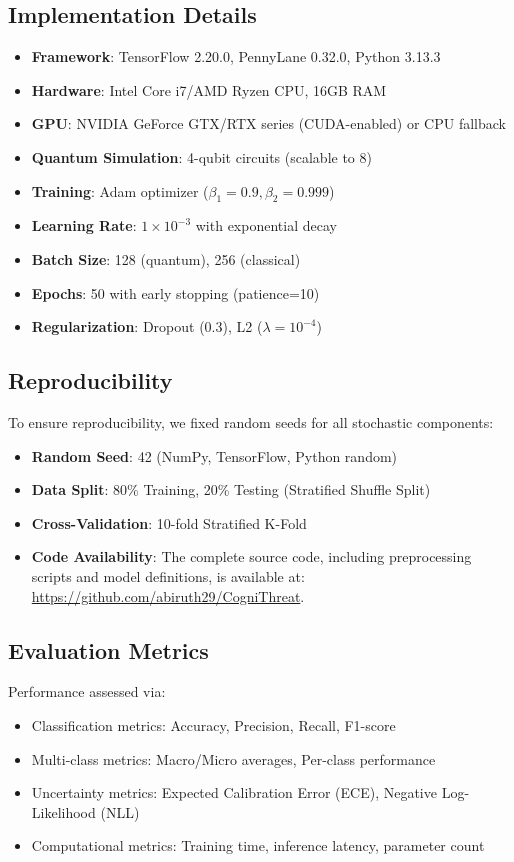 \documentclass[conference]{IEEEtran}
\begin{document}
\subsection{Implementation Details}
\begin{itemize}
    \item \textbf{Framework}: TensorFlow 2.20.0, PennyLane 0.32.0, Python 3.13.3
    \item \textbf{Hardware}: Intel Core i7/AMD Ryzen CPU, 16GB RAM
    \item \textbf{GPU}: NVIDIA GeForce GTX/RTX series (CUDA-enabled) or CPU fallback
    \item \textbf{Quantum Simulation}: 4-qubit circuits (scalable to 8)
    \item \textbf{Training}: Adam optimizer ($\beta_1=0.9, \beta_2=0.999$)
    \item \textbf{Learning Rate}: $1 \times 10^{-3}$ with exponential decay
    \item \textbf{Batch Size}: 128 (quantum), 256 (classical)
    \item \textbf{Epochs}: 50 with early stopping (patience=10)
    \item \textbf{Regularization}: Dropout (0.3), L2 ($\lambda=10^{-4}$)
\end{itemize}

\subsection{Reproducibility}
To ensure reproducibility, we fixed random seeds for all stochastic components:
\begin{itemize}
    \item \textbf{Random Seed}: 42 (NumPy, TensorFlow, Python random)
    \item \textbf{Data Split}: 80\% Training, 20\% Testing (Stratified Shuffle Split)
    \item \textbf{Cross-Validation}: 10-fold Stratified K-Fold
    \item \textbf{Code Availability}: The complete source code, including preprocessing scripts and model definitions, is available at: \url{https://github.com/abiruth29/CogniThreat}.
\end{itemize}

\subsection{Evaluation Metrics}
Performance assessed via:
\begin{itemize}
    \item Classification metrics: Accuracy, Precision, Recall, F1-score
    \item Multi-class metrics: Macro/Micro averages, Per-class performance
    \item Uncertainty metrics: Expected Calibration Error (ECE), Negative Log-Likelihood (NLL)
    \item Computational metrics: Training time, inference latency, parameter count
\end{itemize}
\end{document}
